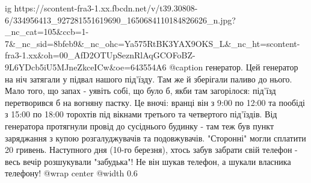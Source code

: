  
 
 
 
 

\ifcmt
  ig https://scontent-fra3-1.xx.fbcdn.net/v/t39.30808-6/334956413_927281551619690_1650684110184826626_n.jpg?_nc_cat=105&ccb=1-7&_nc_sid=8bfeb9&_nc_ohc=Ya575RtBK3YAX9OKS_L&_nc_ht=scontent-fra3-1.xx&oh=00_AfD2OTUpSeznRlAqGCOFoBZ-9L6YDcb5iU5MJneZkceICw&oe=643554A6
	@caption генератор. Цей генератор на ніч затягали у підвал нашого під'їзду. Там же й зберігали паливо до нього. Мало того, що запах - уявіть собі, що було б, якби там загорілося: під'їзд перетворився б на вогняну пастку. Це вночі: вранці він з 9:00 по 12:00 та пообіді з 15:00 по 18:00 торохтів під вікнами третього та четвертого під'їздів.  Від генератора протягнули провід до сусіднього будинку - там теж був пункт заряджання з купою розгалуджувачів та подовжувачів. "Сторонні" могли сплатити 20 гривень. Наступного дня (10-го березня), хтось забув забрати свій телефон - весь вечір розшукували "забудька"! Не він шукав телефон, а шукали власника телефону!
  @wrap center
  @width 0.6
\fi
